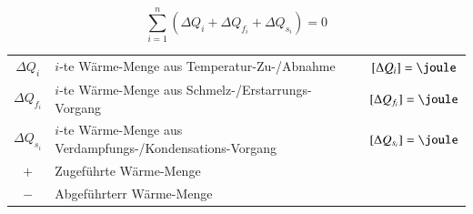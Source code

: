 $$  \boxed{ \sum_{i=1}^n  ( \Delta Q_i + \Delta Q_{f_i} + \Delta Q_{s_i} ) = 0 } $$


\begin{tabular}{c l c@{}}
	$\Delta Q_i$		& $i$-te Wärme-Menge aus Temperatur-Zu-/Abnahme					& $[\Delta Q_i] = \joule$ 			\\
	$\Delta Q_{f_i}$ 	& $i$-te Wärme-Menge aus Schmelz-/Erstarrungs-Vorgang			& $[\Delta Q_{f_i}] = \joule$ 		\\
	$\Delta Q_{s_i}$ 	& $i$-te Wärme-Menge aus Verdampfungs-/Kondensations-Vorgang 	& $[\Delta Q_{s_i}] = \joule$		\\
	$+$					& Zugeführte Wärme-Menge  																			\\
	$-$					& Abgeführterr Wärme-Menge
\end{tabular}
